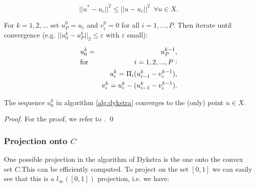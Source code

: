                 $$
                    ||u^{\ast} - u_{c}||^{2} \le ||u - u_{c}||^{2} \,\,\, \forall u \in X.
                $$

                \begin{algorithm}\label{alg:dykstra}
                    For $k = 1, 2, ...$ set $u^{0}_{P} = u_{c}$ and $v^{0}_{i} = 0$ for all $i = 1, ..., P$. Then iterate until convergence (e.g. $||u_{0}^{k} - u_{P}^{k}||_{2} \le \varepsilon$ with $\varepsilon$ small):

                    \begin{eqnarray}
                        &u_{0}^{k} = &u_{P}^{k-1}, \notag \\
                        &\textnormal{for} \,\, &i = 1, 2, ..., P: \notag \\
                        &&u_{i}^{k} = \Pi_{i}(u_{i-1}^{k} - v_{i}^{k-1}), \notag \\
                        &&v_{i}^{k} = u_{i}^{k} - (u_{i-1}^{k} - v_{i}^{k-1}). \notag
                    \end{eqnarray}
                \end{algorithm}

                \begin{proposition}
                    The sequence $u_{0}^{k}$ in algorithm \ref{alg:dykstra} converges to the (only) point $u \in X$.
                \end{proposition}

                \begin{proof}
                    For the proof, we refer to \cite{dykstra-et-al-aors14}.
                    \qed
                \end{proof}

            \subsubsection{Projection onto $C$}

            One possible projection in the algorithm of Dykstra is the one onto the convex set $C$.This can be efficiently computed. To project on the set $[0, 1]$ we can easily see that this is a $l_{\infty}([0, 1])$ projection, i.e. we have:

